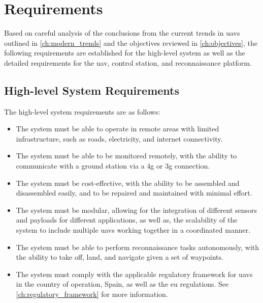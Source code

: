 \chapter{Requirements}\label{ch:requirements}

Based on careful analysis of the conclusions from the current trends in \glspl{uav} outlined in \cref{ch:modern_trends} and the objectives reviewed in \cref{ch:objectives}, the following requirements are established for the high-level system as well as the detailed requirements for the \gls{uav}, control station, and reconnaissance platform.

\section{High-level System Requirements}

The high-level system requirements are as follows:

\begin{itemize}
  \item The system must be able to operate in remote areas with limited infrastructure, such as roads, electricity, and internet connectivity.

  \item The system must be able to be monitored remotely, with the ability to communicate with a ground station via a \gls{4g} or \gls{3g} connection.

  \item The system must be cost-effective, with the ability to be assembled and disassembled easily, and to be repaired and maintained with minimal effort.

  \item The system must be modular, allowing for the integration of different sensors and payloads for different applications, as well as, the scalability of the system to include multiple \glspl{uav} working together in a coordinated manner.

  \item The system must be able to perform reconnaissance tasks autonomously, with the ability to take off, land, and navigate given a set of waypoints.

  \item The system must comply with the applicable regulatory framework for \glspl{uav} in the country of operation, Spain, as well as the \gls{eu} regulations. See \cref{ch:regulatory_framework} for more information.
\end{itemize}

